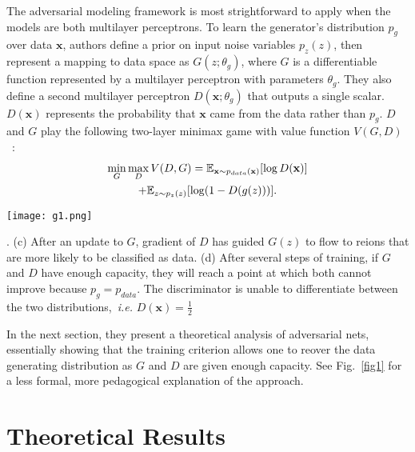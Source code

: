 \documentclass[10pt,twocolumn,letterpaper]{article}
\begin{document}
The adversarial modeling framework is most strightforward to apply when the models are both multilayer perceptrons. To learn the generator's distribution $p_g$ over data $\mathbf{x}$, authors define a prior on input noise variables $p_z(z)$, then represent a mapping to data space as $G(z;\theta_g)$, where $G$ is a differentiable function represented by a multilayer perceptron with parameters $\theta_g$. They also define a second multilayer perceptron $D(\mathbf{x};\theta_g)$ that outputs a single scalar. $D(\mathbf{x})$ represents the probability that $\mathbf{x}$ came from the data rather than $p_g$. $D$ and $G$ play the following two-layer minimax game with value function $V(G,D)$~\cite{gg}:\\
\begin{gather}
\mathop{\min}\limits_{G}\mathop{\max}\limits_DV(D,G) = \mathbb{E}_{\mathbf{x}\sim p_{data}(\mathbf{x})}[\log D(\mathbf{x})] \\
+ \mathbb{E}_{z\sim p_z(z)}[\log(1-D(g(z)))].\notag
\label{eq1}
\end{gather}

\begin{figure*}
\begin{center}
\texttt{[image: g1.png]}
\end{center}
\caption{(a) Consider an adversarial pair near convergence: $p_g$ is similar to $p_{data}$ and $D$ is a partially accurate classifier. (b) In the inner loop of the algorithm $D$ is trained to discriminate samples from data, converging to $D^{\ast}(\mathbf{x}) = \frac{p_{data(\mathbf{x})}}{p_{data}(\mathbf{x}) + p_g(\mathbf{x})}$}. (c) After an update to $G$, gradient of $D$ has guided $G(z)$ to flow to reions that are more likely to be classified as data. (d) After several steps of training, if $G$ and $D$ have enough capacity, they will reach a point at which both cannot improve because $p_g = p_{data}$. The discriminator is unable to differentiate between the two distributions,~\emph{i.e.} $D(\mathbf{x}) = \frac{1}{2}$  
\label{fig1}
\end{figure*}
In the next section, they present a theoretical analysis of adversarial nets, essentially showing that the training criterion allows one to reover the data generating distribution as $G$ and $D$ are given enough capacity. See Fig.~\ref{fig1} for a less formal, more pedagogical explanation of the approach.

\section{Theoretical Results}
\end{document}
